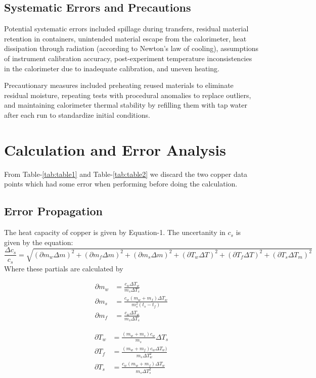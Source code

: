 \documentclass[%
 sor,
 jor,
 amsmath,amssymb,
 reprint,%
]{revtex4-2}
\begin{document}
\subsection{Systematic Errors and Precautions}  
Potential systematic errors included spillage during transfers, residual material retention in containers, unintended material escape from the calorimeter, heat dissipation through radiation (according to Newton's law of cooling), assumptions of instrument calibration accuracy, post-experiment temperature inconsistencies in the calorimeter due to inadequate calibration, and uneven heating.  

Precautionary measures included preheating reused materials to eliminate residual moisture, repeating tests with procedural anomalies to replace outliers, and maintaining calorimeter thermal stability by refilling them with tap water after each run to standardize initial conditions.


\section{Calculation and Error Analysis}
From Table-\ref{tab:table1} and Table-{\ref{tab:table2}} we discard the two copper data points which had some error when performing before doing the calculation. 
\subsection{Error Propagation}

The heat capacity of copper is given by Equation-1. The uncertanity in $c_s$ is given by the equation:
$$
   \frac {\Delta c_s} {c_s} =\sqrt{ 
(\partial m_w \Delta m)^2 + (\partial m_f \Delta m)^2 + (\partial m_s \Delta m)^2 + (\partial T_w \Delta T)^2 + (\partial T_f \Delta T)^2 + (\partial T_s \Delta T_m)^2 
}$$
Where these partials are calculated by\\
\begin{minipage}{0.5\textwidth}
\begin{align*}
  {\partial m_w} &= \frac{c_w \Delta T_w}{m_s \Delta T_s} \\
  {\partial m_s} &= \frac{c_w(m_w +m_f)\Delta T_w}{m_s^2 (t_s - t_f)} \\
    {\partial m_f} &= \frac{c_w \Delta T_w}{m_s \Delta T_s}
\end{align*}
\end{minipage}%
\begin{minipage}{0.5\textwidth}
\begin{align*}
{\partial T_w} &= \frac{(m_w + m_s) c_w}{m_s} {\Delta T_s} \\
   {\partial T_f} &= \frac{(m_w + m_f) c_w \Delta T_w)}{m_s \Delta T_w^2} \\
    {\partial T_s} &= \frac{c_w(m_w +m_f)\Delta T_w}{m_s \Delta T_s^2}
\end{align*}
\end{minipage}
\end{document}

